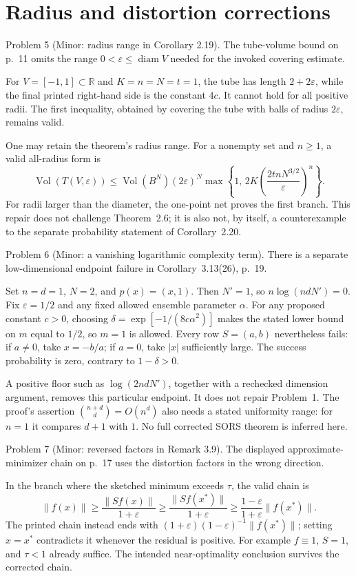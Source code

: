 \documentclass[10pt]{article}
\begin{document}
\section*{Radius and distortion corrections}
Problem 5 (Minor: radius range in Corollary 2.19).  The tube-volume bound on p. 11 omits the range \(0<\varepsilon\le\operatorname{diam}V\) needed for the invoked covering estimate.\par
For \(V=[-1,1]\subset\mathbb R\) and \(K=n=N=t=1\), the tube has length \(2+2\varepsilon\), while the final printed right-hand side is the constant \(4c\). It cannot hold for all positive radii. The first inequality, obtained by covering the tube with balls of radius \(2\varepsilon\), remains valid.\par
One may retain the theorem’s radius range. For a nonempty set and \(n\ge1\), a valid all-radius form is \[\operatorname{Vol}(T(V,\varepsilon))
 \le \operatorname{Vol}(B^N)(2\varepsilon)^N
 \max\!\left\{1,\,
 2K\left(\frac{2tnN^{3/2}}{\varepsilon}\right)^n\right\}.\] For radii larger than the diameter, the one-point net proves the first branch. This repair does not challenge Theorem 2.6; it is also not, by itself, a counterexample to the separate probability statement of Corollary 2.20.\par
Problem 6 (Minor: a vanishing logarithmic complexity term).  There is a separate low-dimensional endpoint failure in Corollary 3.13(26), p. 19.\par
Set \(n=d=1\), \(N=2\), and \(p(x)=(x,1)\). Then \(N'=1\), so \(n\log(ndN')=0\). Fix \(\varepsilon=1/2\) and any fixed allowed ensemble parameter \(\alpha\). For any proposed constant \(c>0\), choosing \(\delta=\exp[-1/(8c\alpha^2)]\) makes the stated lower bound on \(m\) equal to \(1/2\), so \(m=1\) is allowed. Every row \(S=(a,b)\) nevertheless fails: if \(a\ne0\), take \(x=-b/a\); if \(a=0\), take \(|x|\) sufficiently large. The success probability is zero, contrary to \(1-\delta>0\).\par
A positive floor such as \(\log(2ndN')\), together with a rechecked dimension argument, removes this particular endpoint. It does not repair Problem 1. The proof’s assertion \(\binom{n+d}{d}=O(n^d)\) also needs a stated uniformity range: for \(n=1\) it compares \(d+1\) with \(1\). No full corrected SORS theorem is inferred here.\par
Problem 7 (Minor: reversed factors in Remark 3.9).  The displayed approximate-minimizer chain on p. 17 uses the distortion factors in the wrong direction.\par
In the branch where the sketched minimum exceeds \(\tau\), the valid chain is \[\|f(x)\|\ge
 \frac{\|Sf(x)\|}{1+\varepsilon}\ge
 \frac{\|Sf(x^*)\|}{1+\varepsilon}\ge
 \frac{1-\varepsilon}{1+\varepsilon}\|f(x^*)\|.\] The printed chain instead ends with \((1+\varepsilon)(1-\varepsilon)^{-1}\|f(x^*)\|\); setting \(x=x^*\) contradicts it whenever the residual is positive. For example \(f\equiv1\), \(S=1\), and \(\tau<1\) already suffice. The intended near-optimality conclusion survives the corrected chain.\par
\end{document}
